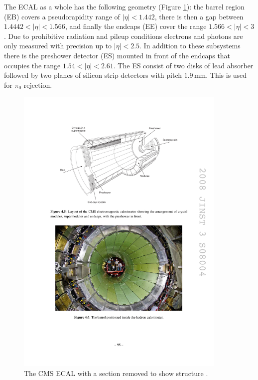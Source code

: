 The ECAL as a whole has the following geometry (Figure \ref{fig:apparatus:ecal}): the barrel region (EB) covers a pseudorapidity range of $|\eta|<1.442$, there is then a gap between $1.4442<|\eta|<1.566$, and finally the endcaps (EE) cover the range $1.566<|\eta|<3$. Due to prohibitive radiation and pileup conditions electrons and photons are only measured with precision up to $|\eta|<2.5$. 
In addition to these subsystems there is the preshower detector (ES) mounted in front of the endcaps that occupies the range $1.54<|\eta|<2.61$. The ES consist of two disks of lead absorber followed by two planes of silicon strip detectors with pitch $1.9$\,mm. This is used for $\pi_{0}$ rejection. 
\begin{figure}[h!]
    \includegraphics[width=0.9\textwidth]{figures/apparatus/ECAL_alt.pdf}
    \caption{The CMS ECAL with a section removed to show structure \cite{CMSatLHC}.}
    \label{fig:apparatus:ecal}
\end{figure}

